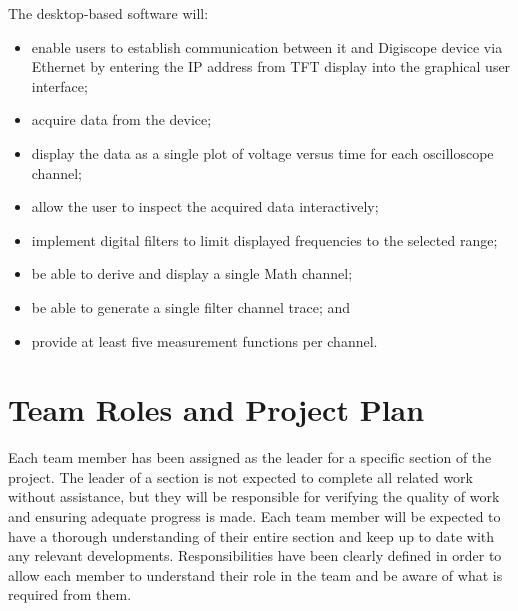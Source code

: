 \documentclass[12pt]{report}
\begin{document}
The desktop-based software will:
\begin{itemize}
	\item enable users to establish communication between it and Digiscope device via Ethernet by entering the IP address from TFT display into the graphical user interface;
	\item acquire data from the device;
	\item display the data as a single plot of voltage versus time for each oscilloscope channel;
	\item allow the user to inspect the acquired data interactively;
	\item implement digital filters to limit displayed frequencies to the selected range;
	\item be able to derive and display a single Math channel;
	\item be able to generate a single filter channel trace; and
	\item provide at least five measurement functions per channel.
\end{itemize}

\chapter{Team Roles and Project Plan}
Each team member has been assigned as the leader for a specific section of the project. The leader of a section is not expected to complete all related work without assistance, but they will be responsible for verifying the quality of work and ensuring adequate progress is made. Each team member will be expected to have a thorough understanding of their entire section and keep up to date with any relevant developments. Responsibilities have been clearly defined in order to allow each member to understand their role in the team and be aware of what is required from them.
\end{document}
